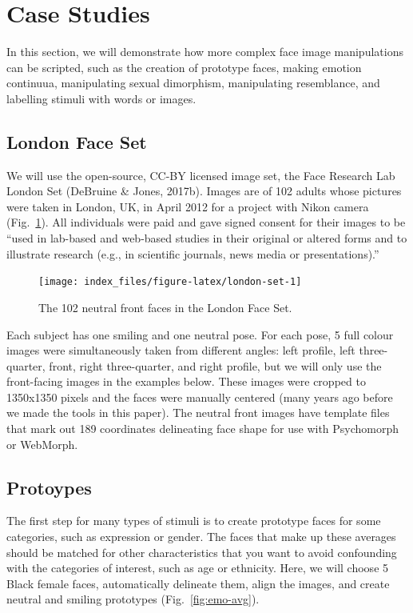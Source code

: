 \documentclass[
  man,floatsintext]{apa6}
\begin{document}
\hypertarget{case-studies}{%
\section{Case Studies}\label{case-studies}}

In this section, we will demonstrate how more complex face image manipulations can be scripted, such as the creation of prototype faces, making emotion continuua, manipulating sexual dimorphism, manipulating resemblance, and labelling stimuli with words or images.

\hypertarget{london-face-set}{%
\subsection{London Face Set}\label{london-face-set}}

We will use the open-source, CC-BY licensed image set, the Face Research Lab London Set (DeBruine \& Jones, 2017b). Images are of 102 adults whose pictures were taken in London, UK, in April 2012 for a project with Nikon camera (Fig.~\ref{fig:london-set}). All individuals were paid and gave signed consent for their images to be ``used in lab-based and web-based studies in their original or altered forms and to illustrate research (e.g., in scientific journals, news media or presentations).''

\begin{figure}
\texttt{[image: index\_files/figure-latex/london-set-1]} \caption{The 102 neutral front faces in the London Face Set.}\label{fig:london-set}
\end{figure}

Each subject has one smiling and one neutral pose. For each pose, 5 full colour images were simultaneously taken from different angles: left profile, left three-quarter, front, right three-quarter, and right profile, but we will only use the front-facing images in the examples below. These images were cropped to 1350x1350 pixels and the faces were manually centered (many years ago before we made the tools in this paper). The neutral front images have template files that mark out 189 coordinates delineating face shape for use with Psychomorph or WebMorph.

\hypertarget{protoypes}{%
\subsection{Protoypes}\label{protoypes}}

The first step for many types of stimuli is to create prototype faces for some categories, such as expression or gender. The faces that make up these averages should be matched for other characteristics that you want to avoid confounding with the categories of interest, such as age or ethnicity. Here, we will choose 5 Black female faces, automatically delineate them, align the images, and create neutral and smiling prototypes (Fig.~\ref{fig:emo-avg}).
\end{document}
